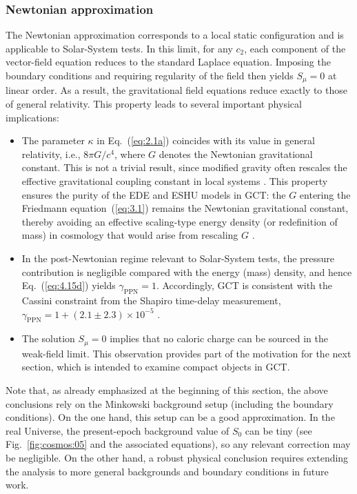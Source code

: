 \documentclass[aps,prd,twocolumn]{revtex4-2}
\begin{document}
\subsubsection{Newtonian approximation}\label{sec:IV.C.1}
The Newtonian approximation corresponds to a local static configuration and is applicable to Solar-System tests. In this limit, for any $c_2$, each component of the vector-field equation reduces to the standard Laplace equation. Imposing the boundary conditions and requiring regularity of the field then yields $S_\mu=0$ at linear order. As a result, the gravitational field equations reduce exactly to those of general relativity. This property leads to several important physical implications:
\begin{itemize}
  \item The parameter $\kappa$ in Eq.~(\ref{eq:2.1a}) coincides with its value in general relativity, i.e., $8\pi G/c^4$, where $G$ denotes the Newtonian gravitational constant. This is not a trivial result, since modified gravity often rescales the effective gravitational coupling constant in local systems \cite{Brans1961.PhysRev.124.925,Bellini2014.JCAP.07.050,Langlois2017.JCAP.05.033,Tian2019.PRD.99.064044}. This property ensures the purity of the EDE and ESHU models in GCT: the $G$ entering the Friedmann equation~(\ref{eq:3.1}) remains the Newtonian gravitational constant, thereby avoiding an effective scaling-type energy density (or redefinition of mass) in cosmology that would arise from rescaling $G$ \cite{Bellini2014.JCAP.07.050}.
  \item In the post-Newtonian regime relevant to Solar-System tests, the pressure contribution is negligible compared with the energy (mass) density, and hence Eq.~(\ref{eq:4.15d}) yields $\gamma_\mathrm{PPN}=1$. Accordingly, GCT is consistent with the Cassini constraint from the Shapiro time-delay measurement, $\gamma_\mathrm{PPN}=1+(2.1\pm2.3)\times10^{-5}$ \cite{Bertotti2003.Nature.425.374}.
  \item The solution $S_\mu=0$ implies that no caloric charge can be sourced in the weak-field limit. This observation provides part of the motivation for the next section, which is intended to examine compact objects in GCT.
\end{itemize}

Note that, as already emphasized at the beginning of this section, the above conclusions rely on the Minkowski background setup (including the boundary conditions). On the one hand, this setup can be a good approximation. In the real Universe, the present-epoch background value of $S_0$ can be tiny (see Fig.~\ref{fig:cosmos:05} and the associated equations), so any relevant correction may be negligible. On the other hand, a robust physical conclusion requires extending the analysis to more general backgrounds and boundary conditions in future work.
\end{document}
